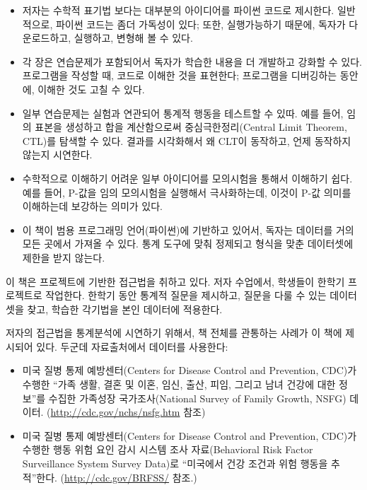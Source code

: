 \begin{itemize}

\item 
저자는 수학적 표기법 보다는 대부분의 아이디어를 파이썬 코드로 제시한다. 일반적으로, 파이썬 코드는 좀더 가독성이 있다; 
또한, 실행가능하기 때문에, 독자가 다운로드하고, 실행하고, 변형해 볼 수 있다.

\item 각 장은 연습문제가 포함되어서 독자가 학습한 내용을 더 개발하고 강화할 수 있다. 프로그램을 작성할 때, 코드로 이해한 것을 표현한다;
프로그램을 디버깅하는 동안에, 이해한 것도 고칠 수 있다.

\item 일부 연습문제는 실험과 연관되어 통계적 행동을 테스트할 수 있따. 예를 들어, 임의 표본을 생성하고 합을 계산함으로써 중심극한정리(Central Limit Theorem, CTL)를 탐색할 수 있다.
결과를 시각화해서 왜 CLT이 동작하고, 언제 동작하지 않는지 시연한다.

\item 수학적으로 이해하기 어려운 일부 아이디어를 모의시험을 통해서 이해하기 쉽다. 예를 들어, P-값을 임의 모의시험을 실행해서 극사화하는데,
이것이 P-값 의미를 이해하는데 보강하는 의미가 있다.

\item 이 책이 범용 프로그래밍 언어(파이썬)에 기반하고 있어서, 독자는 데이터를 거의 모든 곳에서 가져올 수 있다. 
통계 도구에 맞춰 정제되고 형식을 맞춘 데이터셋에 제한을 받지 않는다.

\end{itemize}

이 책은 프로젝트에 기반한 접근법을 취하고 있다. 저자 수업에서, 학생들이 한학기 프로젝트로 작업한다.
한학기 동안 통계적 질문을 제시하고, 질문을 다룰 수 있는 데이터셋을 찾고, 학습한 각기법을 본인 데이터에 적용한다.

저자의 접근법을 통계분석에 시연하기 위해서, 책 전체를 관통하는 사례가 이 책에 제시되어 있다. 두군데 자료출처에서 데이터를 사용한다:


\begin{itemize}

\item 미국 질병 통제 예방센터(Centers for Disease Control and Prevention, CDC)가 수행한 ``가족 생활, 결혼 및 이혼, 임신, 출산, 피임, 그리고 남녀 건강에 대한 정보''를 수집한 가족성장 국가조사(National Survey of Family Growth, NSFG) 데이터. (\url{http://cdc.gov/nchs/nsfg.htm} 참조)

\item 
미국 질병 통제 예방센터(Centers for Disease Control and Prevention, CDC)가 수행한 행동 위험 요인 감시 시스템 조사 자료(Behavioral Risk Factor Surveillance System Survey Data)로 
``미국에서 건강 조건과 위험 행동을 추적''한다. (\url{http://cdc.gov/BRFSS/} 참조.)

\end{itemize}

